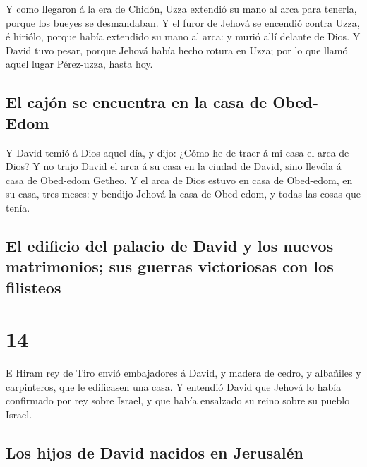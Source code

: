  Y como llegaron á la era de Chidón, Uzza extendió su mano
al arca para tenerla, porque los bueyes se desmandaban. 
Y el furor de Jehová se encendió contra Uzza, é hiriólo, porque había
extendido su mano al arca: y murió allí delante de Dios. 
Y David tuvo pesar, porque Jehová había hecho rotura en Uzza; por lo que
llamó aquel lugar Pérez-uzza, hasta hoy.

\hypertarget{el-cajuxf3n-se-encuentra-en-la-casa-de-obed-edom}{%
\subsection{El cajón se encuentra en la casa de
Obed-Edom}\label{el-cajuxf3n-se-encuentra-en-la-casa-de-obed-edom}}

 Y David temió á Dios aquel día, y dijo: ¿Cómo he de
traer á mi casa el arca de Dios?  Y no trajo David el
arca á su casa en la ciudad de David, sino llevóla á casa de Obed-edom
Getheo.  Y el arca de Dios estuvo en casa de Obed-edom,
en su casa, tres meses: y bendijo Jehová la casa de Obed-edom, y todas
las cosas que tenía.

\hypertarget{el-edificio-del-palacio-de-david-y-los-nuevos-matrimonios-sus-guerras-victoriosas-con-los-filisteos}{%
\subsection{El edificio del palacio de David y los nuevos matrimonios;
sus guerras victoriosas con los
filisteos}\label{el-edificio-del-palacio-de-david-y-los-nuevos-matrimonios-sus-guerras-victoriosas-con-los-filisteos}}

\hypertarget{section-13-14}{%
\section{14}\label{section-13-14}}

 E Hiram rey de Tiro envió embajadores á David, y madera
de cedro, y albañiles y carpinteros, que le edificasen una casa.
 Y entendió David que Jehová lo había confirmado por rey
sobre Israel, y que había ensalzado su reino sobre su pueblo Israel.

\hypertarget{los-hijos-de-david-nacidos-en-jerusaluxe9n}{%
\subsection{Los hijos de David nacidos en
Jerusalén}\label{los-hijos-de-david-nacidos-en-jerusaluxe9n}}

